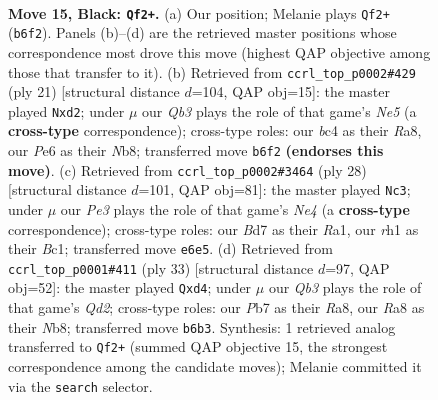 \documentclass[11pt]{article}
\begin{document}
\clearpage

\begin{figure}[p]\centering
\begin{subfigure}{0.46\textwidth}\centering
\resizebox{\linewidth}{!}{%
\newchessgame
\chessboard[
  setfen={rn3rk1/pp1b1ppp/1q2p3/8/2B1P1nP/1Q3N2/PP1N2P1/R3K2R b KQ - 4 15},
  showmover=false,
  pgfstyle=straightmove, color=movearrow, markmove={b6-f2}
]}
\caption{}
\end{subfigure}\hfill
\begin{subfigure}{0.46\textwidth}\centering
\resizebox{\linewidth}{!}{%
\newchessgame
\chessboard[
  setfen={rnbq1rk1/p1p2ppp/4p3/8/2BPn3/P3PN2/3B1PPP/R2QK2R b KQ - 2 11},
  showmover=false,
  pgfstyle=straightmove, color=movearrow, markmove={e4-d2}
]}
\caption{}
\end{subfigure}
\\[4pt]
\begin{subfigure}{0.46\textwidth}\centering
\resizebox{\linewidth}{!}{%
\newchessgame
\chessboard[
  setfen={r2qk2r/pp2bppp/2n5/3Qn3/4N3/5BPP/PP3P2/R1B2RK1 w kq - 1 15},
  showmover=false,
  pgfstyle=straightmove, color=movearrow, markmove={e4-c3}
]}
\caption{}
\end{subfigure}\hfill
\begin{subfigure}{0.46\textwidth}\centering
\resizebox{\linewidth}{!}{%
\newchessgame
\chessboard[
  setfen={rnb2rk1/pp1q1pnp/6p1/8/3Q4/1NN2P2/PP4PP/2KR1B1R b - - 0 17},
  showmover=false,
  pgfstyle=straightmove, color=movearrow, markmove={d7-d4}
]}
\caption{}
\end{subfigure}
\caption{\textbf{Move 15, Black: \texttt{Qf2+}.} (a) Our position; Melanie plays \texttt{Qf2+} (\texttt{b6f2}). Panels (b)--(d) are the retrieved master positions whose correspondence most drove this move (highest QAP objective among those that transfer to it). (b) Retrieved from \texttt{ccrl\_top\_p0002\#429} (ply 21) [structural distance $d$=104, QAP obj=15]: the master played \texttt{Nxd2}; under $\mu$ our \emph{Qb3} plays the role of that game's \emph{Ne5} (a \textbf{cross-type} correspondence); cross-type roles: our \emph{b}c4 as their \emph{R}a8, our \emph{P}e6 as their \emph{N}b8; transferred move \texttt{b6f2} \textbf{(endorses this move)}. (c) Retrieved from \texttt{ccrl\_top\_p0002\#3464} (ply 28) [structural distance $d$=101, QAP obj=81]: the master played \texttt{Nc3}; under $\mu$ our \emph{Pe3} plays the role of that game's \emph{Ne4} (a \textbf{cross-type} correspondence); cross-type roles: our \emph{B}d7 as their \emph{R}a1, our \emph{r}h1 as their \emph{B}c1; transferred move \texttt{e6e5}. (d) Retrieved from \texttt{ccrl\_top\_p0001\#411} (ply 33) [structural distance $d$=97, QAP obj=52]: the master played \texttt{Qxd4}; under $\mu$ our \emph{Qb3} plays the role of that game's \emph{Qd2}; cross-type roles: our \emph{P}b7 as their \emph{R}a8, our \emph{R}a8 as their \emph{N}b8; transferred move \texttt{b6b3}. Synthesis: 1 retrieved analog transferred to \texttt{Qf2+} (summed QAP objective 15, the strongest correspondence among the candidate moves); Melanie committed it via the \texttt{search} selector.}
\label{fig:thought-m29}
\end{figure}
\end{document}

